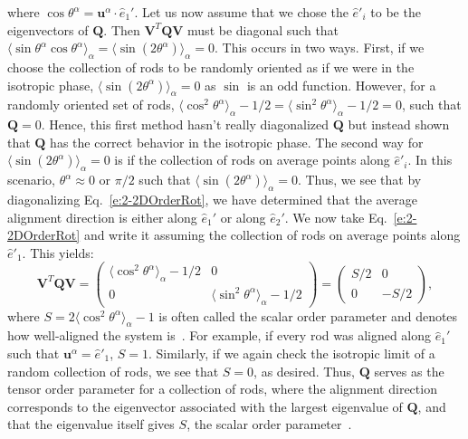 where $\cos \theta^{\alpha} = \mathbf{u}^{\alpha} \cdot \hat{e}_1'$.
Let us now assume that we chose the $\hat{e}'_i$ to be the eigenvectors of $\mathbf{Q}$.
Then $ \mathbf{V}^T \mathbf{Q} \mathbf{V}$ must be diagonal such that $\langle \sin \theta^{\alpha} \cos \theta^{\alpha} \rangle_{\alpha} = \langle \sin (2 \theta^{\alpha}) \rangle_{\alpha} = 0$.
This occurs in two ways.
First, if we choose the collection of rods to be randomly oriented as if we were in the isotropic phase, $\langle \sin (2 \theta^{\alpha}) \rangle_{\alpha} = 0$ as $\sin$ is an odd function.
However, for a randomly oriented set of rods, $\langle \cos^2 \theta^{\alpha}\rangle_{\alpha} - 1/2 = \langle \sin^2 \theta^{\alpha}\rangle_{\alpha} - 1/2 = 0$, such that $\mathbf{Q} = 0$.
Hence, this first method hasn't really diagonalized $\mathbf{Q}$ but instead shown that $\mathbf{Q}$ has the correct behavior in the isotropic phase.
The second way for $\langle \sin (2 \theta^{\alpha}) \rangle_{\alpha} = 0$ is if the collection of rods on average points along $\hat{e}'_i$.
In this scenario, $\theta^{\alpha} \approx 0 \textrm{ or } \pi/2$ such that $\langle \sin (2 \theta^{\alpha}) \rangle_{\alpha} = 0$.
Thus, we see that by diagonalizing Eq.~\ref{e:2-2DOrderRot}, we have determined that the average alignment direction is either along $\hat{e}_1'$ or along $\hat{e}_2'$.
We now take Eq.~\ref{e:2-2DOrderRot} and write it assuming the collection of rods on average points along $\hat{e}'_1$.
This yields:
\begin{equation}
  \mathbf{V}^T \mathbf{Q} \mathbf{V} =
  \begin{pmatrix}
    \langle \cos^2 \theta^{\alpha}\rangle_{\alpha} - 1/2 & 0 \\
    0 & \langle \sin^2 \theta^{\alpha} \rangle_{\alpha} - 1/2
  \end{pmatrix} =
  \begin{pmatrix}
    S/2 & 0 \\
    0 & -S/2
  \end{pmatrix},\label{e:2-2DOrderDiagBig}
\end{equation}
where $S = 2 \langle \cos^2 \theta^{\alpha} \rangle_{\alpha} - 1$ is often called the scalar order parameter and denotes how well-aligned the system is~\cite{RN33}.
For example, if every rod was aligned along $\hat{e}_1'$ such that $\mathbf{u}^{\alpha} = \hat{e}'_1$, $S = 1$.
Similarly, if we again check the isotropic limit of a random collection of rods, we see that $S = 0$, as desired.
Thus, $\mathbf{Q}$ serves as the tensor order parameter for a collection of rods, where the alignment direction corresponds to the eigenvector associated with the largest eigenvalue of $\mathbf{Q}$, and that the eigenvalue itself gives $S$, the scalar order parameter~\cite{RN33}.
